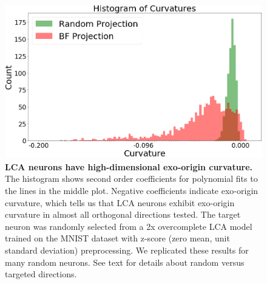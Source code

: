 \begin{figure}[h]
    \centering
    \includegraphics[width=\textwidth]{figures/iso_contour_lca_hists.png}
    \caption{\textbf{LCA neurons have high-dimensional exo-origin curvature.} The histogram shows second order coefficients for polynomial fits to the lines in the middle plot. Negative coefficients indicate exo-origin curvature, which tells us that LCA neurons exhibit exo-origin curvature in almost all orthogonal directions tested. The target neuron was randomly selected from a 2x overcomplete LCA model trained on the MNIST dataset with z-score (zero mean, unit standard deviation) preprocessing. We replicated these results for many random neurons. See text for details about random versus targeted directions.}
    \label{fig:ch4_iso_contour_lca_hists}
\end{figure}


